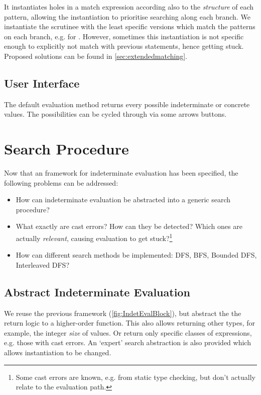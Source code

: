 It instantiates holes in a match expression according also to the \textit{structure} of each pattern, allowing the instantiation to prioritise searching along each branch. We instantiate the scrutinee with the least specific versions which match the patterns on each branch, e.g.  for . However, sometimes this instantiation is not specific enough to explicitly not match with previous statements, hence getting stuck. Proposed solutions can be found in \cref{sec:extendedmatching}.

\subsection{User Interface}\label{sec:UIIndetEval}
The default evaluation method returns every possible indeterminate or concrete values. The possibilities can be cycled through via some arrows buttons.

\section{Search Procedure}\label{sec:SearchProcedure}
Now that an framework for indeterminate evaluation has been specified, the following problems can be addressed:
\begin{itemize}
\item[\ref{sec:AbstractSearch}] How can indeterminate evaluation be abstracted into a generic search procedure?
\item[\ref{sec:CastFailureDetection}] What exactly are cast errors? How can they be detected? Which ones are actually \textit{relevant}, causing evaluation to get stuck?\footnote{Some cast errors are known, e.g. from static type checking, but don't actually relate to the evaluation path.}
\item[\ref{sec:SearchMethods}] How can different search methods be implemented: DFS, BFS, Bounded DFS, Interleaved DFS? 
\end{itemize}

\subsection{Abstract Indeterminate Evaluation}
\label{sec:AbstractSearch}
We reuse the previous framework (\cref{fig:IndetEvalBlock}), but abstract the the return logic to a higher-order  function. This also allows returning other types, for example, the integer \textit{size} of values. Or return only specific classes of expressions, e.g. those with cast errors. An `expert' search abstraction is also provided which allows instantiation to be changed.

